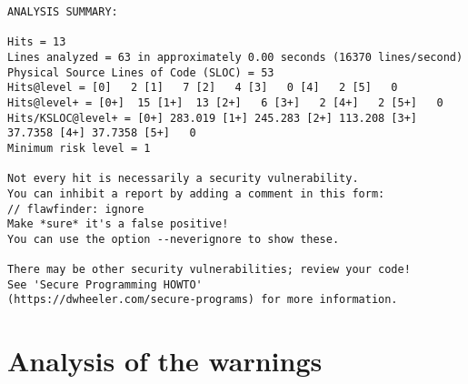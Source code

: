 \documentclass{article}
\begin{document}
\begin{verbatim}
ANALYSIS SUMMARY:

Hits = 13
Lines analyzed = 63 in approximately 0.00 seconds (16370 lines/second)
Physical Source Lines of Code (SLOC) = 53
Hits@level = [0]   2 [1]   7 [2]   4 [3]   0 [4]   2 [5]   0
Hits@level+ = [0+]  15 [1+]  13 [2+]   6 [3+]   2 [4+]   2 [5+]   0
Hits/KSLOC@level+ = [0+] 283.019 [1+] 245.283 [2+] 113.208 [3+] 37.7358 [4+] 37.7358 [5+]   0
Minimum risk level = 1

Not every hit is necessarily a security vulnerability.
You can inhibit a report by adding a comment in this form:
// flawfinder: ignore
Make *sure* it's a false positive!
You can use the option --neverignore to show these.

There may be other security vulnerabilities; review your code!
See 'Secure Programming HOWTO'
(https://dwheeler.com/secure-programs) for more information.
\end{verbatim}

\section{Analysis of the warnings}
\end{document}

